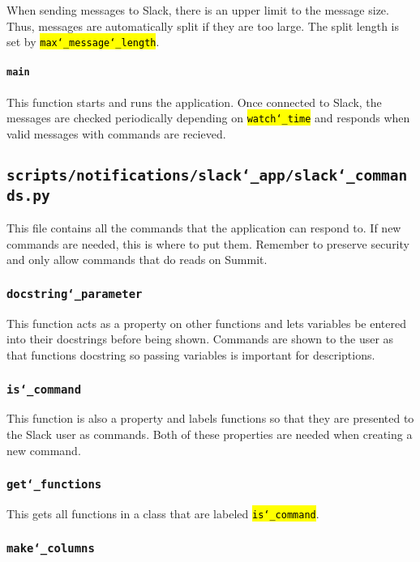 \documentclass{article}
\newcommand{\un}[0]{\char`_}
\newcommand{\code}[1]{\textcolor{red}{\hl{\texttt{#1}}}}
\begin{document}
When sending messages to Slack, there is an upper limit to the message size. Thus, messages are automatically split if they are too large. The split length is set by \code{max\un message\un length}.

\paragraph{\texttt{main}}

This function starts and runs the application. Once connected to Slack, the messages are checked periodically depending on \code{watch\un time} and responds when valid messages with commands are recieved.

\subsection{\texttt{scripts/notifications/slack\un app/slack\un commands.py}}

This file contains all the commands that the application can respond to. If new commands are needed, this is where to put them. Remember to preserve security and only allow commands that do reads on Summit.

\subsubsection{\texttt{docstring\un parameter}}

This function acts as a property on other functions and lets variables be entered into their docstrings before being shown. Commands are shown to the user as that functions docstring so passing variables is important for descriptions.

\subsubsection{\texttt{is\un command}}

This function is also a property and labels functions so that they are presented to the Slack user as commands. Both of these properties are needed when creating a new command.

\subsubsection{\texttt{get\un functions}}

This gets all functions in a class that are labeled \code{is\un command}.

\subsubsection{\texttt{make\un columns}}
\end{document}
